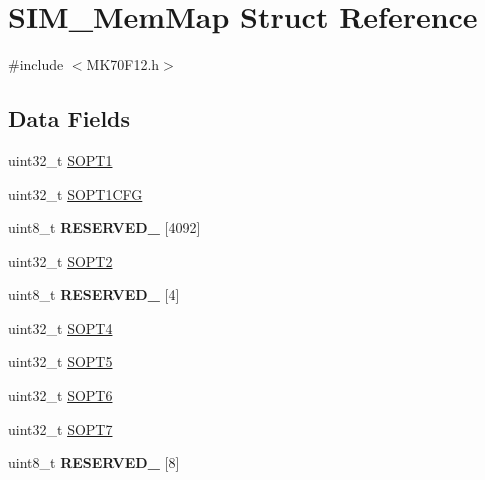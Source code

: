 \hypertarget{struct_s_i_m___mem_map}{}\section{S\+I\+M\+\_\+\+Mem\+Map Struct Reference}
\label{struct_s_i_m___mem_map}


{\ttfamily \#include $<$M\+K70\+F12.\+h$>$}

\subsection*{Data Fields}
\begin{DoxyCompactItemize}
\item 
uint32\+\_\+t \hyperlink{struct_s_i_m___mem_map_a1152a6ef88c78e762df97badf10b5050}{S\+O\+P\+T1}
\item 
uint32\+\_\+t \hyperlink{struct_s_i_m___mem_map_a9b6ea6819e80eeaa90754b6e91fcc808}{S\+O\+P\+T1\+C\+F\+G}
\item 
\hypertarget{struct_s_i_m___mem_map_afaf8190e210f8ed4ae7309c0ef700304}{}uint8\+\_\+t {\bfseries R\+E\+S\+E\+R\+V\+E\+D\+\_} \mbox{[}4092\mbox{]}\label{struct_s_i_m___mem_map_afaf8190e210f8ed4ae7309c0ef700304}

\item 
uint32\+\_\+t \hyperlink{struct_s_i_m___mem_map_ae4c4bf827aeca9c2de082cdfafdea3d1}{S\+O\+P\+T2}
\item 
\hypertarget{struct_s_i_m___mem_map_ae97b8ef108928032cc6070216fec02ec}{}uint8\+\_\+t {\bfseries R\+E\+S\+E\+R\+V\+E\+D\+\_} \mbox{[}4\mbox{]}\label{struct_s_i_m___mem_map_ae97b8ef108928032cc6070216fec02ec}

\item 
uint32\+\_\+t \hyperlink{struct_s_i_m___mem_map_adf28cda65cea7072379ec6064d0d93cc}{S\+O\+P\+T4}
\item 
uint32\+\_\+t \hyperlink{struct_s_i_m___mem_map_a19e2ddf391b1d9c03240be8267fdf781}{S\+O\+P\+T5}
\item 
uint32\+\_\+t \hyperlink{struct_s_i_m___mem_map_aa8030cdf04fef86a5fd4b10f7686e5fa}{S\+O\+P\+T6}
\item 
uint32\+\_\+t \hyperlink{struct_s_i_m___mem_map_a04a22056fd7d08179705d29cda1b9e2a}{S\+O\+P\+T7}
\item 
\hypertarget{struct_s_i_m___mem_map_ad2fdee624a3af7bd030a350a9632a6a9}{}uint8\+\_\+t {\bfseries R\+E\+S\+E\+R\+V\+E\+D\+\_} \mbox{[}8\mbox{]}\label{struct_s_i_m___mem_map_ad2fdee624a3af7bd030a350a9632a6a9}


\end{DoxyCompactItemize}
